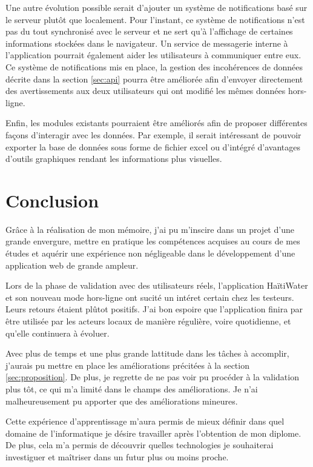 \documentclass{EPL-master-thesis-covers-FR}
\begin{document}
			Une autre évolution possible serait d'ajouter un système de notifications basé sur le serveur plutôt que localement. Pour l'instant, ce système de notifications n'est pas du tout synchronisé avec le serveur et ne sert qu'à l'affichage de certaines informations stockées dans le navigateur. Un service de messagerie interne à l'application pourrait également aider les utilisateurs à communiquer entre eux. Ce système de notifications mis en place, la gestion des incohérences de données décrite dans la section \ref{sec:api} pourra être améliorée afin d'envoyer directement des avertissements aux deux utilisateurs qui ont modifié les mêmes données hors-ligne.
		
			Enfin, les modules existants pourraient être améliorés afin de proposer différentes façons d'interagir avec les données. Par exemple, il serait intéressant de pouvoir exporter la base de données sous forme de fichier excel ou d'intégré d'avantages d'outils graphiques rendant les informations plus visuelles.




	\chapter{Conclusion}
		Grâce à la réalisation de mon mémoire, j'ai pu m'inscire dans un projet d'une grande envergure, mettre en pratique les compétences acquises au cours de mes études et aquérir une expérience non négligeable dans le développement d'une application web de grande ampleur.
		
		Lors de la phase de validation avec des utilisateurs réels, l'application HaïtiWater et son nouveau mode hors-ligne ont sucité un intéret certain chez les testeurs. Leurs retours étaient plûtot positifs. J'ai bon espoire que l'application finira par être utilisée par les acteurs locaux de manière régulière, voire quotidienne, et qu'elle continuera à évoluer.
		
		Avec plus de temps et une plus grande lattitude dans les tâches à accomplir, j'aurais pu mettre en place les améliorations précitées à la section \ref{sec:proposition}. De plus, je regrette de ne pas voir pu procéder à la validation plus tôt, ce qui m'a limité dans le champs des améliorations. Je n'ai malheureusement pu apporter que des améliorations mineures.

		Cette expérience d'apprentissage m'aura permis de mieux définir dans quel domaine de l'informatique je désire travailler après l'obtention de mon diplome. De plus, cela m'a permis de découvrir quelles technologies je souhaiterai investiguer et maîtriser dans un futur plus ou moins proche.
		
\end{document}
